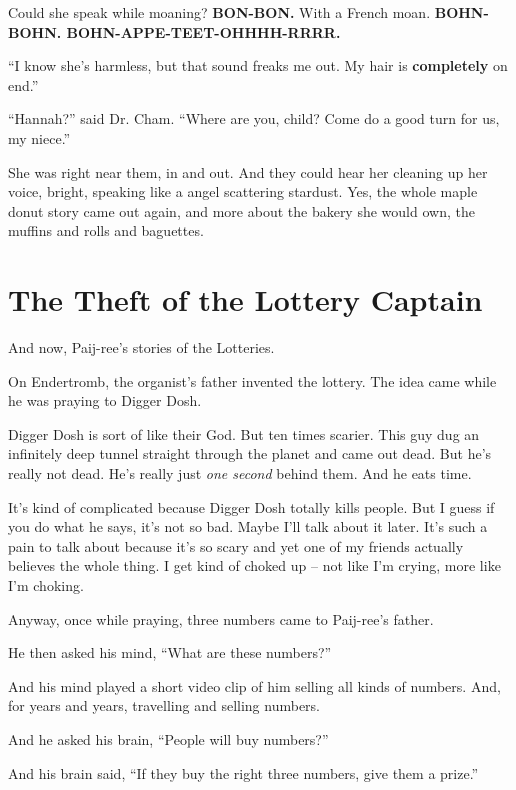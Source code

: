 \documentclass[12pt,twoside]{report}
\begin{document}
Could she speak while moaning? {\bf BON-BON.}  With a French moan.
{\bf BOHN-BOHN. BOHN-APPE-TEET-OHHHH-RRRR.}

``I know she's harmless, but that sound freaks me out.  My hair is
{\bf completely} on end.''

``Hannah?'' said Dr. Cham.  ``Where are you, child?  Come do a good
turn for us, my niece.''

She was right near them, in and out.  And they could hear her cleaning
up her voice, bright, speaking like a angel scattering stardust. Yes,
the whole maple donut story came out again, and more about the bakery
she would own, the muffins and rolls and baguettes.

\newpage


\section{The Theft of the Lottery Captain}




And now, Paij-ree's stories of the Lotteries.

On Endertromb, the organist's father invented the lottery.  The idea
came while he was praying to Digger Dosh.

Digger Dosh is sort of like their God.  But ten times scarier.  This
guy dug an infinitely deep tunnel straight through the planet and came
out dead. But he's really not dead.  He's really just {\em one second}
behind them.  And he eats time.

It's kind of complicated because Digger Dosh totally kills people.
But I guess if you do what he says, it's not so bad.  Maybe I'll talk
about it later.  It's such a pain to talk about because it's so scary
and yet one of my friends actually believes the whole thing.  I get
kind of choked up -- not like I'm crying, more like I'm choking.

Anyway, once while praying, three numbers came to Paij-ree's father.

He then asked his mind, ``What are these numbers?''

And his mind played a short video clip of him selling all kinds of
numbers.  And, for years and years, travelling and selling numbers.

And he asked his brain, ``People will buy numbers?''

And his brain said, ``If they buy the right three numbers, give them a
prize.''
\end{document}
